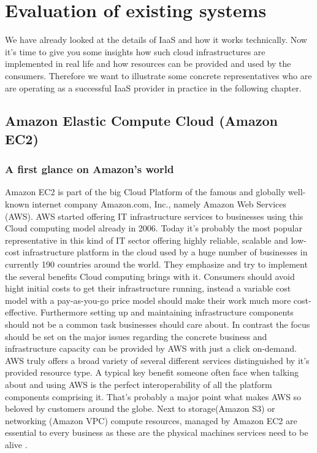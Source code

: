 \chapter{Evaluation of existing systems}
\label{chap:evaluation}
We have already looked at the details of IaaS and how it works technically.
Now it's time to give you some insights how such cloud infrastructures are implemented in real life and how resources can be provided and used by the consumers. Therefore we want to illustrate some concrete representatives who are are operating as a successful IaaS provider in practice in the following chapter.

\section{Amazon Elastic Compute Cloud (Amazon EC2)}

\subsection{A first glance on Amazon's world}
Amazon EC2 is part of the big Cloud Platform of the famous and globally well-known internet company Amazon.com, Inc., namely Amazon Web Services (AWS). AWS started offering IT infrastructure services to businesses using this Cloud computing model already in 2006. Today it's probably the most popular representative in this kind of IT sector offering highly reliable, scalable and low-cost infrastructure platform in the cloud used by a huge number of businesses in currently 190 countries around the world. They emphasize and try to implement the several benefits Cloud computing brings with it. Consumers should avoid hight initial costs to get their infrastructure running, instead a variable cost model with a pay-as-you-go price model should make their work much more cost-effective. Furthermore setting up and maintaining infrastructure components should not be a common task businesses should care about. In contrast the focus should be set on the major issues regarding the concrete business and infrastructure capacity can be provided by AWS with just a click on-demand. AWS truly offers a broad variety of several different services distinguished by it's provided resource type. A typical key benefit someone often face when talking about and using AWS is the perfect interoperability of all the platform components comprising it. That's probably a major point what makes AWS so beloved by customers around the globe. Next to storage(Amazon S3) or networking (Amazon VPC) compute resources, managed by Amazon EC2 are essential to every business as these are the physical machines services need to be alive \cite{AWS_Overview}.

